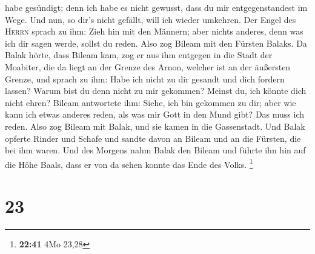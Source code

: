 habe gesündigt; denn ich habe es nicht gewusst, dass du mir
entgegenstandest im Wege. Und nun, so dir's nicht gefällt, will ich
wieder umkehren.  Der Engel des \textsc{Herrn} sprach zu
ihm: Zieh hin mit den Männern; aber nichts anderes, denn was ich dir
sagen werde, sollst du reden. Also zog Bileam mit den Fürsten Balaks.
 Da Balak hörte, dass Bileam kam, zog er aus ihm entgegen
in die Stadt der Moabiter, die da liegt an der Grenze des Arnon, welcher
ist an der äußersten Grenze,  und sprach zu ihm: Habe ich
nicht zu dir gesandt und dich fordern lassen? Warum bist du denn nicht
zu mir gekommen? Meinst du, ich könnte dich nicht ehren? 
Bileam antwortete ihm: Siehe, ich bin gekommen zu dir; aber wie kann ich
etwas anderes reden, als was mir Gott in den Mund gibt? Das muss ich
reden.  Also zog Bileam mit Balak, und sie kamen in die
Gassenstadt.  Und Balak opferte Rinder und Schafe und
sandte davon an Bileam und an die Fürsten, die bei ihm waren.
 Und des Morgens nahm Balak den Bileam und führte ihn hin
auf die Höhe Baals, dass er von da sehen konnte das Ende des Volks.
\footnote{\textbf{22:41} 4Mo 23,28}

\hypertarget{section-4}{%
\section{23}\label{section-4}}

